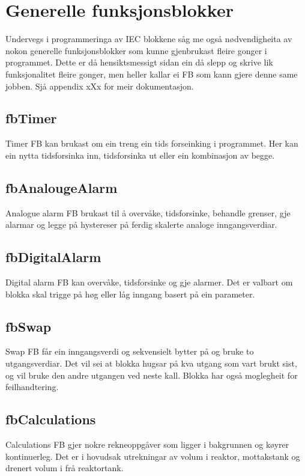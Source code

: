 \section{Generelle funksjonsblokker}
\thispagestyle{fancy}


Undervegs i programmeringa av \gls{IEC} blokkene såg me også nødvendigheita av nokon generelle funksjonsblokker
som kunne gjenbrukast fleire gonger i programmet. Dette er då hensiktsmessigt sidan ein då slepp og skrive lik 
funksjonalitet fleire gonger, men heller kallar ei \gls{FB} som kann gjere denne same jobben. \newline
Sjå appendix xXx for meir dokumentasjon.

\subsection{fbTimer}
Timer \gls{FB} kan brukast om ein treng ein tids forseinking i programmet.
Her kan ein nytta tidsforsinka inn, tidsforsinka ut eller ein kombinasjon av begge.

\subsection{fbAnalougeAlarm}
Analogue alarm \gls{FB} brukast til å overvåke, tidsforsinke, behandle grenser, 
gje alarmar og legge på hystereser på ferdig skalerte analoge inngangsverdiar.

\subsection{fbDigitalAlarm}
Digital alarm \gls{FB} kan overvåke, tidsforsinke og gje alarmer. Det er valbart om blokka skal trigge på høg eller låg
inngang basert på ein parameter.

\subsection{fbSwap}
Swap \gls{FB} får ein inngangsverdi og sekvensielt bytter på og bruke to utgangsverdiar. Det vil sei at blokka hugsar på kva utgang som vart brukt sist,
og vil bruke den andre utgangen ved neste kall. Blokka har også moglegheit for feilhandtering.

\subsection{fbCalculations}
Calculations \gls{FB} gjer nokre rekneoppgåver som ligger i bakgrunnen og køyrer kontinuerleg. 
Det er i hovudsak utrekningar av volum i reaktor, mottakstank og drenert volum i frå reaktortank.

